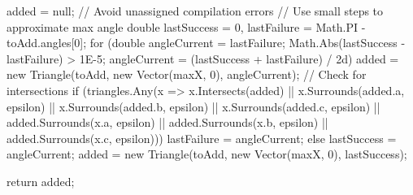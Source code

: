 \documentclass[12pt]{article}
\begin{document}
\begin{Csharp}[caption=static class TriangleArranger]
{    added = null; // Avoid unassigned compilation errors
                    // Use small steps to approximate max angle
    double lastSuccess = 0, lastFailure = Math.PI - toAdd.angles[0];
    for (double angleCurrent = lastFailure; Math.Abs(lastSuccess - lastFailure) > 1E-5; angleCurrent = (lastSuccess + lastFailure) / 2d)
    {
        added = new Triangle(toAdd, new Vector(maxX, 0), angleCurrent);
        // Check for intersections
        if (triangles.Any(x => x.Intersects(added)
        || x.Surrounds(added.a, epsilon) || x.Surrounds(added.b, epsilon) || x.Surrounds(added.c, epsilon)
        || added.Surrounds(x.a, epsilon) || added.Surrounds(x.b, epsilon) || added.Surrounds(x.c, epsilon)))
        {
            lastFailure = angleCurrent;
        }
        else
        {
            lastSuccess = angleCurrent;
        }
    }
    added = new Triangle(toAdd, new Vector(maxX, 0), lastSuccess);

    return added;
}
\end{Csharp}
\end{document}
